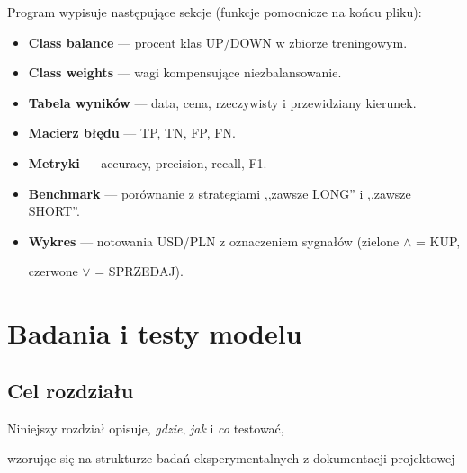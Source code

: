\documentclass[12pt,a4paper]{report}
\begin{document}
Program wypisuje następujące sekcje (funkcje pomocnicze na końcu pliku):



\begin{itemize}

    \item \textbf{Class balance} --- procent klas UP/DOWN w zbiorze treningowym.

    \item \textbf{Class weights} --- wagi kompensujące niezbalansowanie.

    \item \textbf{Tabela wyników} --- data, cena, rzeczywisty i przewidziany kierunek.

    \item \textbf{Macierz błędu} --- TP, TN, FP, FN.

    \item \textbf{Metryki} --- accuracy, precision, recall, F1.

    \item \textbf{Benchmark} --- porównanie z strategiami ,,zawsze LONG'' i ,,zawsze SHORT''.

    \item \textbf{Wykres} --- notowania USD/PLN z oznaczeniem sygnałów (zielone $\wedge$ = KUP,

          czerwone $\vee$ = SPRZEDAJ).

\end{itemize}




\chapter{Badania i testy modelu}




\section{Cel rozdziału}



Niniejszy rozdział opisuje, \emph{gdzie}, \emph{jak} i \emph{co} testować,

wzorując się na strukturze badań eksperymentalnych z dokumentacji projektowej
\end{document}
